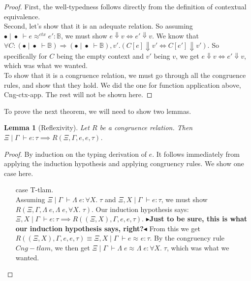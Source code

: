 \documentclass[twoside,11pt,openright]{report}
\newtheorem{lemma}[theorem]{Lemma}
\theoremstyle{definition}
\newcommand{\expr}{e}
\newcommand{\val}{v}
\newcommand{\Tvar}{X}
\newcommand{\Tlam}{\Lambda\;}
\newcommand{\ctx}{C}
\newcommand{\Tbool}{\mathbb{B}}
\newcommand{\Tall}[2]{\forall #1.\; #2}
\newcommand{\typ}{\tau}
\newcommand{\venv}{\Gamma}
\newcommand{\tenv}{\Xi}
\newcommand{\emptenv}{\bullet}
\newcommand{\empvenv}{\bullet}
\newcommand{\jdg}[4]{#1 \; | \; #2 \; \vdash #3 : #4}
\newcommand{\jdgType}[3]{#1 \; | \; #2 \; \vdash #3}
\newcommand{\jdgRel}[6]{#1 \; | \; #2 \; \vdash #3 \approx^{#4} #5 : #6}
\newcommand{\ctxRel}[5]{\jdgRel{#1}{#2}{#3}{ctx}{#4}{#5}}
\newcommand{\todo}[1]{{\color[rgb]{.5,0,0}\textbf{$\blacktriangleright$#1$\blacktriangleleft$}}}
\begin{document}
\begin{proof}
  First, the well-typedness follows directly from the definition of contextual equivalence.\\
  Second, let's show that it is an adequate relation. So assuming $\ctxRel{\emptenv}{\empvenv}{\expr}{\expr'}{\Tbool}$, we must show $\expr \Downarrow \val \iff \expr' \Downarrow \val$. We know that $\forall \ctx : (\jdgType{\emptenv}{\empvenv}{\Tbool}) \Rightarrow (\jdgType{\emptenv}{\empvenv}{\Tbool}), \val' . (\ctx[\expr] \Downarrow \val' \iff \ctx[\expr'] \Downarrow \val')$. So specifically for $C$ being the empty context and $\val'$ being $\val$, we get $\expr \Downarrow \val \iff \expr' \Downarrow \val$, which was what we wanted.\\
  To show that it is a congruence relation, we must go through all the congruence rules, and show that they hold. We did the one for function application above, Cng-ctx-app. The rest will not be shown here.
\end{proof}

To prove the next theorem, we will need to show two lemmas.
\begin{lemma}[Reflexivity]\label{lem:R_Cng_is_reflexive}
  Let $R$ be a congruence relation. Then $\jdg{\tenv}{\venv}{\expr}{\typ} \implies R(\tenv, \venv, \expr, \expr, \typ)$.
\end{lemma}
\begin{proof}
  By induction on the typing derivation of $\expr$. It follows immediately from applying the induction hypothesis and applying congruency rules. We show one case here.
  \begin{itemize}
    \item[case] T-tlam.\\
      Assuming $\jdg{\tenv}{\venv}{\Tlam \expr}{\Tall{\Tvar}{\typ}}$ and $\jdg{\tenv, \Tvar}{\venv}{\expr}{\typ}$, we must show $R(\tenv, \venv, \Tlam \expr, \Tlam \expr, \Tall{\Tvar}{\typ})$. Our induction hypothesis says: $\jdg{\tenv, \Tvar}{\venv}{\expr}{\typ} \implies R((\tenv, \Tvar), \venv, \expr, \expr, \typ)$. \todo{Just to be sure, this is what our induction hypothesis says, right?} From this we get $R((\tenv, \Tvar), \venv, \expr, \expr, \typ) \equiv \jdgRel{\tenv, \Tvar}{\venv}{\expr}{}{\expr}{\typ}$. By the congruency rule $Cng-tlam$, we then get $\jdgRel{\tenv}{\venv}{\Tlam \expr}{}{\Tlam \expr}{\Tall{\Tvar}{\typ}}$, which was what we wanted.
  \end{itemize}
\end{proof}
\end{document}
